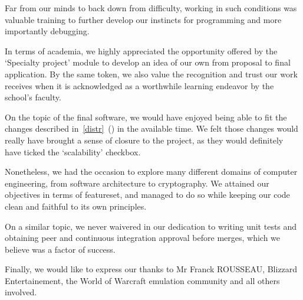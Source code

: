 \documentclass[paper=a4, fontsize=11pt]{scrartcl}
\begin{document}
Far from our minds to back down from difficulty, working in such conditions was
valuable training to further develop our instincts for programming and
more importantly debugging. 

In terms of academia, we highly appreciated the opportunity offered by the
`Specialty project' module to develop an idea of our own from proposal
to final application.
By the same token, we also value the recognition and trust our work receives
when it is acknowledged as a worthwhile learning endeavor by the school's
faculty.

On the topic of the final software, we would have enjoyed being able to fit the
changes described in~\ref{distr}~() in the available time.
We felt those changes would really have brought a sense of closure to the
project, as they would definitely have ticked the `scalability' checkbox.

Nonetheless, we had the occasion to explore many different domains of
computer engineering, from software architecture to cryptography.  We attained
our objectives in terms of featureset, and managed to do so while keeping our
code clean and faithful to its own principles.

On a similar topic, we never waivered in our dedication to writing unit tests
and obtaining peer and continuous integration approval before merges, which
we believe was a factor of success.

Finally, we would like to express our thanks to Mr Franck ROUSSEAU, Blizzard
Entertainement, the World of Warcraft emulation community and all others
involved.
\end{document}
